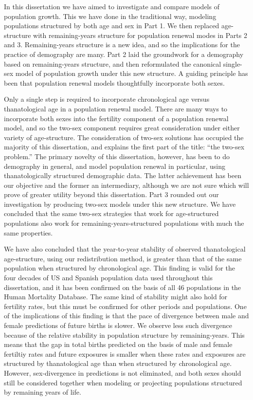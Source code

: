 
In this dissertation we have aimed to investigate and compare models of
population growth. This we have done in the traditional way, modeling populations 
structured by both age and sex in Part 1. We then replaced age-structure with remaining-years
structure for population renewal modes in Parts 2 and 3. Remaining-years
structure is a new idea, and so the implications for the practice of demography are many. Part
2 laid the groundwork for a demography based on remaining-years
structure, and then reformulated the canonical single-sex model of population
growth under this new structure. A guiding principle has been that
population renewal models thoughtfully incorporate both sexes. 

Only a single step is required to incorporate chronological age versus
thanatological age in a population renewal model. There are many ways to incorporate both sexes
into the fertility component of a population renewal model, and so the 
two-sex component requires great consideration under either
variety of age-structure. The consideration of two-sex solutions has occupied
the majority of this dissertation, and explains the first part of 
the title: ``the two-sex problem.'' The primary
novelty of this dissertation, however, has been to do demography in general, and
model population renewal in particular, using thanatologically structured
demographic data. The latter achievement has been our objective and the former
an intermediary, although we are not sure which will prove of greater utility
beyond this dissertation. Part 3 rounded out our investigation by producing
two-sex models under this new structure. We have concluded that the same two-sex 
strategies that work for age-structured populations also work for
remaining-years-structured populations with much the same properties.

We have also concluded that the year-to-year stability of observed
thanatological age-structure, using our redistribution method, is
greater than that of the same population when structured by
chronological age. This finding is valid for the four decades of US and
Spanish population data used throughout this dissertation, and it has been
confirmed on the basis of all 46 populations in the Human Mortality Database.
The same kind of stability might also hold for fertility rates, but this must be
confirmed for other periods and populations. One of the implications of this
finding is that the pace of divergence between male and female predictions of 
future births is slower. We observe less such divergence because of the
relative stability in population structure by remaining-years. This
means that the gap in total births predicted on the basis of male and female 
fertiltiy rates and future exposures is smaller when these rates and exposures 
are structured by thanatological age than when structured by chronological age. However,
sex-divergence in predictions is not eliminated, and both sexes should still
be considered together when modeling or projecting populations structured
by remaining years of life.

